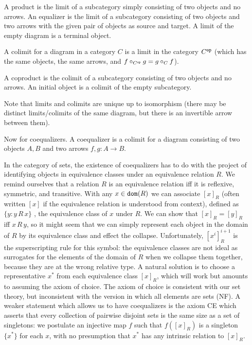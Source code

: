 \documentclass[12pt]{article}
\begin{document}
A product is the limit of a subcategory simply consisting of two objects and no arrows.  An equalizer is the limit of a subcategory consisting of two objects and two arrows with the given pair of objects as source and target.  A limit of the empty diagram is a terminal object.

A colimit for a diagram in a category $C$ is a limit in the category $C^{\tt op}$ (which has the same objects, the same arrows, and $f \circ_{C^{\tt op}} g = g \circ_C f$).

A coproduct is the colimit of a subcategory consisting of two objects and no arrows.  An initial object is a colimit of the empty subcategory.

Note that limits and colimits are unique up to isomorphism (there may be distinct limits/colimits of the same diagram, but there is an invertible arrow between them).

Now for coequalizers.  A coequalizer is a colimit for a diagram consisting of two objects $A,B$ and two arrows $f,g:A \rightarrow B$.

In the category of sets, the existence of coequalizers has to do with the project of identifying objects in equivalence classes under an equivalence relation $R$.
We remind ourselves that a relation $R$  is an equivalence relation iff it is reflexive, symmetric, and transitive.  With any $x \in {\tt dom}(R)$ we can associate $[x]_R$
(often written $[x]$ if the equivalence relation is understood from context), defined as $\{y:y \,R\,x\}$ , the equivalence class of $x$ under $R$.  We can show that
$[x]_R = [y]_R$ iff $x \, R\, y$, so it might seem that we can simply represent each object in the domain of $R$ by its equivalence class and effect the collapse.  Unfortunately,
$[x^i]_R^{i+1}$ is the superscripting rule for this symbol:  the equivalence classes are not ideal as surrogates for the elements of the domain of $R$ when we collapse them together, because they are at the wrong relative type.  A natural solution is to choose a representative $x^*$ from each equivalence class $[x]_R$, which will work but amounts to assuming the axiom of choice.  The axiom of choice is consistent with our set theory, but inconsistent with the version in which all elements are sets (NF).  A weaker statement which allows us to have coequalizers is the
axiom CE which asserts that every collection of pairwise disjoint sets is the same size as a set of singletons:  we postulate an injective map $f$ such that
$f([x]_R)$ is a singleton $\{x^*\}$ for each $x$, with no presumption that $x^*$ has any intrinsic relation to $[x]_R$.
\end{document}
